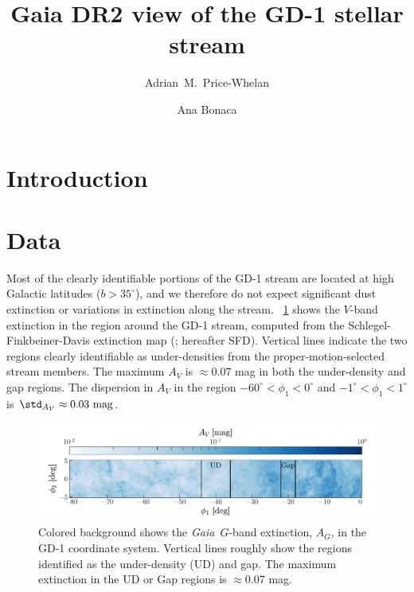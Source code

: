 \documentclass[modern]{aastex62}
\newcommand{\gaia}{\textsl{Gaia}}
\begin{document}
\sloppy\sloppypar\raggedbottom\frenchspacing %

\title{Gaia DR2 view of the GD-1 stellar stream}

\author[0000-0003-0872-7098]{Adrian~M.~Price-Whelan}

\author[0000-0002-7846-9787]{Ana Bonaca}


\begin{abstract}\noindent %

\end{abstract}


\section{Introduction}
\label{sec:intro}


\section{Data}
\label{sec:data}


Most of the clearly identifiable portions of the GD-1 stream are located at high
Galactic latitudes ($b > 35^\circ$), and we therefore do not expect significant
dust extinction or variations in extinction along the stream.
\figurename~\ref{fig:sfd} shows the $V$-band extinction in the region around the
GD-1 stream, computed from the Schlegel-Finkbeiner-Davis extinction map
(\cite{Schlegel:1998}; hereafter SFD).
Vertical lines indicate the two regions clearly identifiable as under-densities
from the proper-motion-selected stream members.
The maximum $A_V$ is $\approx$0.07 mag in both the under-density and gap
regions.
The dispersion in $A_V$ in the region $-60^\circ < \phi_1 < 0^\circ$ and
$-1^\circ < \phi_1 < 1^\circ$ is $\std_{A_V} \approx 0.03~\textrm{mag}$.

\begin{figure}[h]
\begin{center}
\includegraphics[width=\textwidth]{sfd.pdf}
\end{center}
\caption{%
Colored background shows the \gaia\ $G$-band extinction, $A_G$, in the GD-1
coordinate system.
Vertical lines roughly show the regions identified as the under-density (UD) and
gap.
The maximum extinction in the UD or Gap regions is $\approx$0.07 mag.
\label{fig:sfd}
}
\end{figure}
\end{document}
